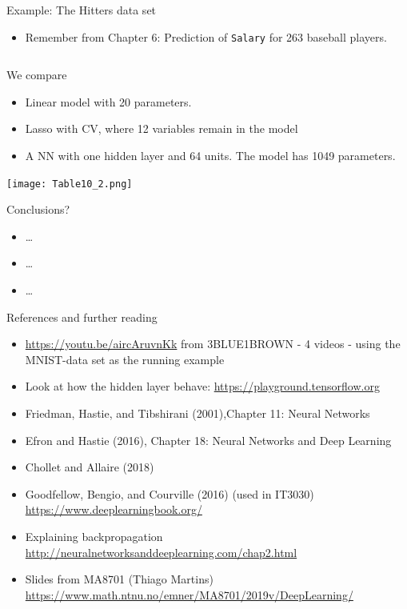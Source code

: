 \documentclass[
  10pt,
  ignorenonframetext,
]{beamer}
\providecommand{\tightlist}{%
  \setlength{\itemsep}{0pt}\setlength{\parskip}{0pt}}
\begin{document}
\begin{frame}[fragile]
\begin{block}{Example: The Hitters data set}
\protect\hypertarget{example-the-hitters-data-set}{}
\(~\)

\begin{itemize}
\tightlist
\item
  Remember from Chapter 6: Prediction of \texttt{Salary} for 263
  baseball players.
\end{itemize}

\(~\)

We compare

\vspace{2mm}

\begin{itemize}
\tightlist
\item
  Linear model with 20 parameters.
\item
  Lasso with CV, where 12 variables remain in the model
\item
  A NN with one hidden layer and 64 units. The model has 1049
  parameters.
\end{itemize}
\end{block}
\end{frame}

\begin{frame}
\texttt{[image: Table10\_2.png]} \(~\)

Conclusions?

\begin{itemize}
\tightlist
\item
  \ldots{}
\item
  \ldots{}
\item
  \ldots{}
\end{itemize}
\end{frame}

\begin{frame}{References and further reading}
\protect\hypertarget{references-and-further-reading}{}
\begin{itemize}
\tightlist
\item
  \url{https://youtu.be/aircAruvnKk} from 3BLUE1BROWN - 4 videos - using
  the MNIST-data set as the running example
\item
  Look at how the hidden layer behave:
  \url{https://playground.tensorflow.org}
\item
  Friedman, Hastie, and Tibshirani (2001),Chapter 11: Neural Networks
\item
  Efron and Hastie (2016), Chapter 18: Neural Networks and Deep Learning
\item
  Chollet and Allaire (2018)
\item
  Goodfellow, Bengio, and Courville (2016) (used in IT3030)
  \url{https://www.deeplearningbook.org/}
\item
  Explaining backpropagation
  \url{http://neuralnetworksanddeeplearning.com/chap2.html}
\item
  Slides from MA8701 (Thiago Martins)
  \url{https://www.math.ntnu.no/emner/MA8701/2019v/DeepLearning/}
\end{itemize}
\end{frame}
\end{document}
